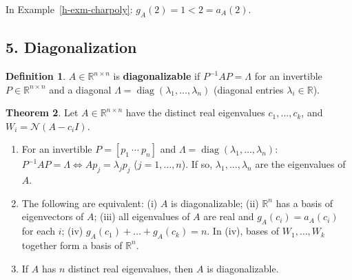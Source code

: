 \documentclass[12pt]{article}
\newcommand{\R}{\mathbb R}
\DeclareMathOperator{\diag}{diag}
\theoremstyle{definition}
\newtheorem{theorem}{Theorem}
\newtheorem{definition}[theorem]{Definition}
\begin{document}
In Example~\ref{h-exm-charpoly}: \(g_A(2)=1<2=a_A(2)\).

\subsection*{5. Diagonalization}

\begin{definition}\label{h-def-diagonalizable}
\(A\in\R^{n\times n}\) is \textbf{diagonalizable} if \(P^{-1}AP=\Lambda\) for an invertible \(P\in\R^{n\times n}\) and a
diagonal \(\Lambda=\diag(\lambda_1,\dots,\lambda_n)\) (diagonal entries \(\lambda_i\in\R\)).
\end{definition}

\begin{theorem}\label{h-thm-diag-criterion}
Let \(A\in\R^{n\times n}\) have the distinct real eigenvalues \(c_1,\dots,c_k\), and \(W_i=\mathcal N(A-c_iI)\).
\begin{enumerate}
\item For an invertible \(P=[p_1\ \cdots\ p_n]\) and \(\Lambda=\diag(\lambda_1,\dots,\lambda_n)\):
\(P^{-1}AP=\Lambda\iff Ap_j=\lambda_jp_j\) (\(j=1,\dots,n\)). If so, \(\lambda_1,\dots,\lambda_n\) are the eigenvalues of
\(A\).
\item The following are equivalent: (i) \(A\) is diagonalizable; (ii) \(\R^n\) has a basis of eigenvectors of \(A\);
(iii) all eigenvalues of \(A\) are real and \(g_A(c_i)=a_A(c_i)\) for each \(i\); (iv)
\(g_A(c_1)+\dots+g_A(c_k)=n\). In (iv), bases of \(W_1,\dots,W_k\) together form a basis of \(\R^n\).
\item If \(A\) has \(n\) distinct real eigenvalues, then \(A\) is diagonalizable.
\end{enumerate}
\end{theorem}
\end{document}
